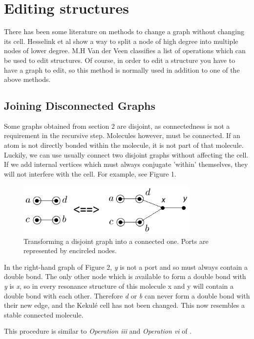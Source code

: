 \documentclass[12pt]{article}
\begin{document}
\section{Editing structures}

There has been some literature on methods to change a graph without changing its cell. Hesselink et al \cite{HH13} show a way to split a node of high degree into multiple nodes of lower degree. M.H Van der Veen \cite{v06} classifies a list of operations which can be used to edit structures. Of course, in order to edit a structure you have to have a graph to edit, so this method is normally used in addition to one of the above methods. 

\subsection{Joining Disconnected Graphs}

Some graphs obtained from section 2 are disjoint, as connectedness is not a requirement in the recursive step. Molecules however, must be connected. If an atom is not directly bonded within the molecule, it is not part of that molecule. Luckily, we can use usually connect two disjoint graphs without affecting the cell. If we add internal vertices which must always conjugate 'within' themselves, they will not interfere with the cell. For example, see Figure 1. 

\begin{figure}[ht!]
\centering
\includegraphics[width=90mm]{disjoint.png}
\caption{Transforming a disjoint graph into a connected one. Ports are represented by encircled nodes.}
\end{figure}

In the right-hand graph of Figure 2, \textit{y} is not a port and so must always contain a double bond. The only other node which is available to form a double bond with \textit{y} is \textit{x}, so in every resonance structure of this molecule x and y will contain a double bond with each other. Therefore \textit{d} or \textit{b} can never form a double bond with their new edge, and the Kekul\'{e} cell has not been changed. This now resembles a stable connected molecule. 

This procedure is similar to \textit{Operation iii} and \textit{Operation vi} of \cite{v06}. 
\end{document}
